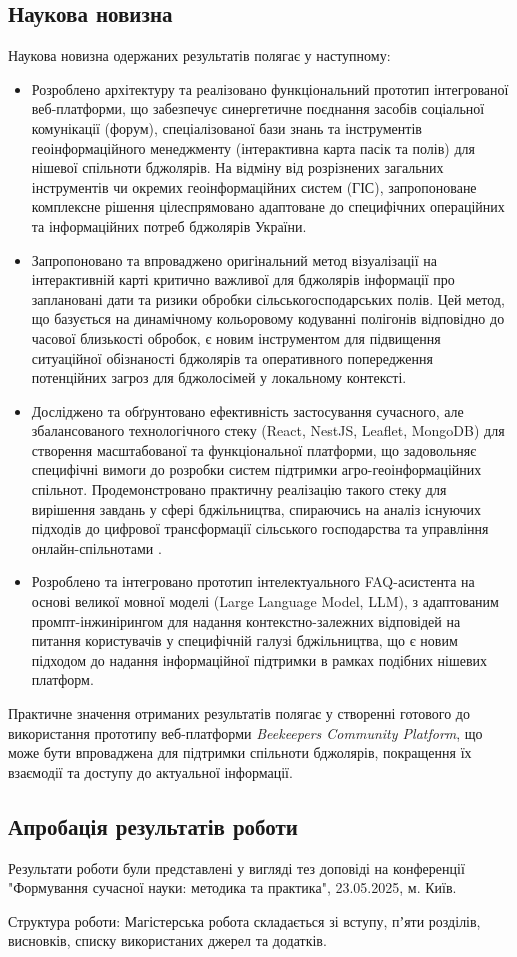 \subsection*{Наукова новизна}
Наукова новизна одержаних результатів полягає у наступному:
\begin{itemize}
    \item Розроблено архітектуру та реалізовано функціональний прототип інтегрованої веб-платформи, що забезпечує синергетичне поєднання засобів соціальної комунікації (форум), спеціалізованої бази знань та інструментів геоінформаційного менеджменту (інтерактивна карта пасік та полів) для нішевої спільноти бджолярів. На відміну від розрізнених загальних інструментів чи окремих геоінформаційних систем (ГІС), запропоноване комплексне рішення цілеспрямовано адаптоване до специфічних операційних та інформаційних потреб бджолярів України.
    \item Запропоновано та впроваджено оригінальний метод візуалізації на інтерактивній карті критично важливої для бджолярів інформації про заплановані дати та ризики обробки сільськогосподарських полів. Цей метод, що базується на динамічному кольоровому кодуванні полігонів відповідно до часової близькості обробок, є новим інструментом для підвищення ситуаційної обізнаності бджолярів та оперативного попередження потенційних загроз для бджолосімей у локальному контексті.
    \item Досліджено та обґрунтовано ефективність застосування сучасного, але збалансованого технологічного стеку (React, NestJS, Leaflet, MongoDB) для створення масштабованої та функціональної платформи, що задовольняє специфічні вимоги до розробки систем підтримки агро-геоінформаційних спільнот. Продемонстровано практичну реалізацію такого стеку для вирішення завдань у сфері бджільництва, спираючись на аналіз існуючих підходів до цифрової трансформації сільського господарства та управління онлайн-спільнотами \cite{preece2005onlinecommunities, huet2022digitalbeekeeping, guruprasad2024beeopen}.
    \item Розроблено та інтегровано прототип інтелектуального FAQ-асистента на основі великої мовної моделі (Large Language Model, LLM), з адаптованим промпт-інжинірингом для надання контекстно-залежних відповідей на питання користувачів у специфічній галузі бджільництва, що є новим підходом до надання інформаційної підтримки в рамках подібних нішевих платформ.
\end{itemize}

Практичне значення отриманих результатів полягає у створенні готового до використання прототипу веб-платформи \textit{Beekeepers Community Platform}, що може бути впроваджена для підтримки спільноти бджолярів, покращення їх взаємодії та доступу до актуальної інформації.

\subsection*{Апробація результатів роботи}
Результати роботи були представлені у вигляді тез доповіді на конференції "Формування сучасної науки: методика та практика", 23.05.2025, м. Київ.

Структура роботи: Магістерська робота складається зі вступу, пʼяти розділів, висновків, списку використаних джерел та додатків. 